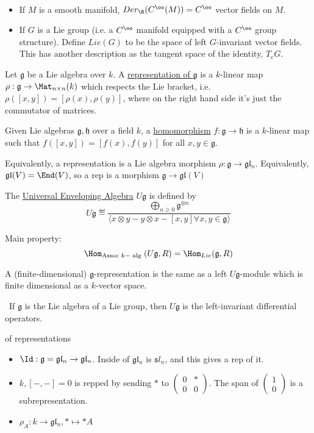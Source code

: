 \documentclass[x11names,reqno,14pt]{extarticle}
\newcommand{\pmat}[4]{\begin{pmatrix} #1 & #2 \\ #3 & #4 \end{pmatrix}}
\newcommand{\mk}[1]{\mathfrak{#1}}
\newcommand{\g}{\mk{g}}
\newcommand{\h}{\mk{h}}
\newcommand{\gl}{\mk{g}\mk{l}}
\begin{document}
\exm
\,
\begin{itemize}

\item If $M$ is a smooth manifold, $Der_\R(C^\oo(M)) = C^\oo$ vector fields on $M$. 

\item If $G$ is a Lie group (i.e. a $C^\oo$ manifold equipped with a $C^\oo$ group structure). Define $Lie(G)$ to be the space of left $G$-invariant vector fields. This has another description as the tangent space of the identity, $T_eG$.
\end{itemize}


Let $\g$ be a Lie algebra over $k$. A \underline{representation of $\g$} is a $k$-linear map $\rho:\g\to\Mat_{n\times n}(k)$ which respects the Lie bracket, i.e. $\rho([x,y]) = [\rho(x),\rho(y)]$, where on the right hand side it's just the commutator of matrices. 


Given Lie algebras $\g, \h$ over a field $k$, a \underline{homomorphism} $f:\g\to\h$ is a $k$-linear map such that $f([x,y]) = [f(x),f(y)]$ for all $x, y \in \g$. 

Equivalently, a representation is a Lie algebra morphism $\rho:\g\to\gl_n$. Equivalently, $\gl(V) = \End(V)$, so a rep is a morphism $\g\to\gl(V)$


The \underline{Universal Enveloping Algebra} $U\g$ is defined by 
\[
U\g \eqdef \frac{\bigoplus_{n\geq0}\g^{\otimes n}}{\langle x\otimes y -  y\otimes x - [x,y] \forall x, y \in \g \rangle}
\]

Main property:
\[
\Hom_{\text{Assoc }k-\text{ alg }}(U\g,R) = \Hom_{Lie}(\g,R)
\]


A (finite-dimensional) $\g$-representation is the same as a left $U\g$-module which is finite dimensional as a $k$-vector space.

\exm
\,
If $\g$ is the Lie algebra of a Lie group, then $U\g$ is the left-invariant differential operators. 

\exm
of representations
\,
\begin{itemize}

\item $\Id:\g = \gl_n\to\gl_n$. Inside of $\gl_n$ is $\mathfrak{s}l_n$, and this gives a rep of it. 

\item $k, [-,-] = 0$ is repped by sending $*$ to $\pmat{0}{*}{0}{0}$. The span of $\begin{pmatrix}1\\0\end{pmatrix}$ is a subrepresentation.

\item $\rho_A:k\to\gl_n, * \mapsto *A$

\end{itemize}
\end{document}
